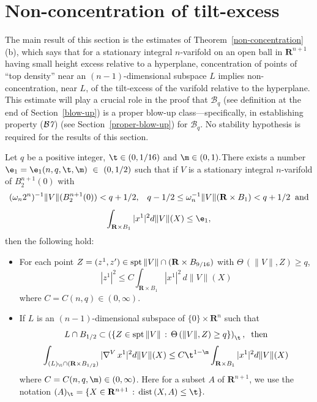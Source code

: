 \documentclass[a4paper,11pt]{amsart}
\begin{document}
\section{Non-concentration of tilt-excess}\label{non-con-tilt}
\setcounter{equation}{0}

The main result of this section is the estimates of Theorem~\ref{non-concentration}(b), which says that for a stationary integral $n$-varifold on an open ball in ${\mathbf R}^{n+1}$ having small height excess relative to a hyperplane, concentration of points of ``top density'' near an $(n-1)$-dimensional subspace $L$ implies non-concentration, near $L$, of the tilt-excess of the varifold relative to the hyperplane. This estimate will play a crucial role in the proof that ${\mathcal B}_{q}$  (see definition at the end of Section~\ref{blow-up}) is a proper blow-up class---specifically, in establishing property (${\mathcal B{\emph 7}}$) (see Section~\ref{proper-blow-up}) for ${\mathcal B}_{q}$. No stability hypothesis is required for the results of this section.
 
\begin{theorem}\label{non-concentration}
Let $q$ be a positive integer, $\t \in (0, 1/16)$ and $\m \in (0, 1).$There exists a number $\e_{1} = \e_{1}(n, q, \t, \m)~\in~(0,1/2)$ such that if $V$ is a stationary integral $n$-varifold of $B_{2}^{n+1}(0)$ with 
$$(\omega_{n}2^{n})^{-1}\|V\|(B_{2}^{n+1}(0)) < q + 1/2, \;\;\;  q-1/2 \leq \omega_{n}^{-1}\|V\|({\mathbf R} \times B_{1}) < q + 1/2 \;\; {\rm and}$$  
$$\int_{{\mathbf R} \times B_{1}} |x^{1}|^{2}d\|V\|(X)\leq \e_{1},$$
then the following hold:
\begin{itemize}
\item[(a)] For each point $Z = (z^{1}, z^{\prime}) \in {\rm spt} \, \|V\| \cap({\mathbf R} \times B_{9/16})$ with $\Theta \, (\|V\|, Z) \geq q$, $$|z^{1}|^{2} \leq C\int_{{\mathbf R} \times B_{1}} |x^{1}|^{2} \, d\|V\|(X)$$ where $C = C(n, q) \in (0, \infty).$
\item[(b)] If $L$ is an $(n-1)$-dimensional subspace of $\{0\} \times {\mathbf R}^{n}$ such that 
$$L \cap B_{1/2} \subset \left(\{Z  \in {\rm spt} \, \|V\|\, : \, \Theta \, (\|V\|, Z) \geq q\}\right)_{\t}, \;\; {\rm then}$$ 
$$\int_{(L)_{\t} \cap ({\mathbf R} \times B_{1/2})} |\nabla^{V} \, x^{1}|^{2} d\|V\|(X) \leq C\t^{1-\m}\int_{{\mathbf R} \times B_{1}} |x^{1}|^{2}d\|V\|(X)$$
\noindent
where  $C = C(n, q, \m) \in (0, \infty)$. Here for a subset $A$ of 
${\mathbf R}^{n+1}$, we use the notation $(A)_{\t} = \{X \in {\mathbf R}^{n+1} \, : \, {\rm dist} \, (X, A) \leq \t\}.$
\end{itemize} 
\end{theorem}
\end{document}
